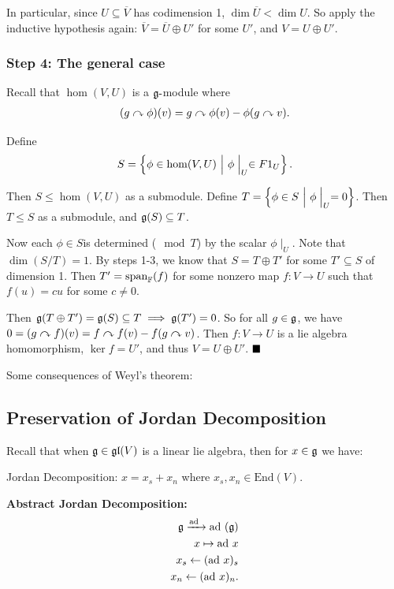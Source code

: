 In particular, since \(U \subseteq \overline V\) has codimension 1,
\(\dim \overline U < \dim U\). So apply the inductive hypothesis again:
\(\overline V = \overline U \oplus U'\) for some \(U'\), and
\(V = U \oplus U'\).

\hypertarget{step-4-the-general-case}{%
\subsubsection{Step 4: The general case}\label{step-4-the-general-case}}

Recall that \(\hom(V, U)\) is a \({\mathfrak{g}}{\hbox{-}}\)module where
\begin{align*}
(g \curvearrowright \phi)(v) = g\curvearrowright\phi(v) - \phi(g\curvearrowright v)
.\end{align*}

Define \[
S = \left\{{\phi \in \hom(V, U) {~\mathrel{\Big|}~} \phi\mathrel{\Big|}_U \in F 1_U}\right\}.
\]

Then \(S \leq \hom(V, U)\) as a submodule. Define
\(T = \left\{{\phi \in S {~\mathrel{\Big|}~} \phi\mathrel{\Big|}_U = 0}\right\}\). Then \(T \leq S\)
as a submodule, and \({\mathfrak{g}}(S) \subseteq T\).

Now each \(\phi\in S\)is determined (\(\mod T\)) by the scalar
\(\phi\mid_U\). Note that \(\dim(S/T) = 1\). By steps 1-3, we know that
\(S = T \oplus T'\) for some \(T' \subseteq S\) of dimension 1. Then
\(T' = \mathrm{span}_{\mathbb{F}}(f)\) for some nonzero map \(f: V \to U\) such
that \(f(u) = cu\) for some \(c \neq 0\).

Then
\({\mathfrak{g}}(T \oplus T') = {\mathfrak{g}} (S) \subseteq T \implies {\mathfrak{g}}(T') = 0\).
So for all \(g\in {\mathfrak{g}}\), we have
\(0 = (g\curvearrowright f)(v) = f \curvearrowright f(v) - f(g\curvearrowright v)\). Then
\(f: V \to U\) is a lie algebra homomorphism, \(\ker f = U'\), and thus
\(V = U \oplus U'\). \(\qed\)

Some consequences of Weyl's theorem:

\hypertarget{preservation-of-jordan-decomposition}{%
\subsection{Preservation of Jordan
Decomposition}\label{preservation-of-jordan-decomposition}}

Recall that when \({\mathfrak{g}} \in {\mathfrak{gl}}(V)\) is a linear lie algebra, then
for \(x\in {\mathfrak{g}}\) we have:

Jordan Decomposition: \(x = x_s + x_n\) where
\(x_s, x_n \in \mathrm{End}(V)\).

\textbf{Abstract Jordan Decomposition:} \begin{align*}
{\mathfrak{g}} \xrightarrow{\mathrm{ad}~} \mathrm{ad}~({\mathfrak{g}}) \\
x \mapsto \mathrm{ad}~ x \\
x_s \leftarrow(\mathrm{ad}~ x)_s \\
x_n \leftarrow  (\mathrm{ad}~ x)_n
.\end{align*}

